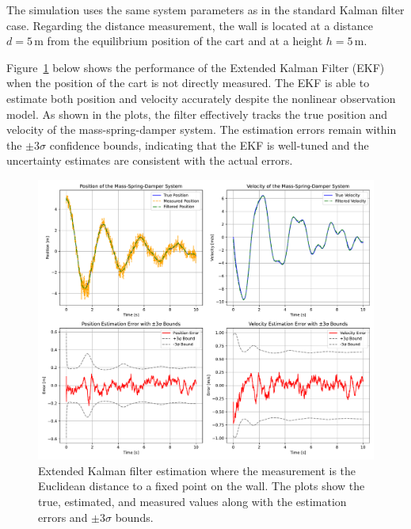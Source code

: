 The simulation uses the same system parameters as in the standard Kalman filter case. Regarding the distance measurement, the wall is located at a distance \( d = 5 \, \text{m} \) from the equilibrium position of the cart and at a height \( h = 5 \, \text{m} \).

Figure~\ref{fig:ekf} below shows the performance of the Extended Kalman Filter (EKF) when the position of the cart is not directly measured. The EKF is able to estimate both position and velocity accurately despite the nonlinear observation model. As shown in the plots, the filter effectively tracks the true position and velocity of the mass-spring-damper system. The estimation errors remain within the \( \pm 3\sigma \) confidence bounds, indicating that the EKF is well-tuned and the uncertainty estimates are consistent with the actual errors.

\begin{figure}[H]
    \centering
    \includegraphics[width=1\textwidth]{figures/ekf.pdf}
    \caption{Extended Kalman filter estimation where the measurement is the Euclidean distance to a fixed point on the wall. The plots show the true, estimated, and measured values along with the estimation errors and \( \pm 3\sigma \) bounds.}
    \label{fig:ekf}
\end{figure}



